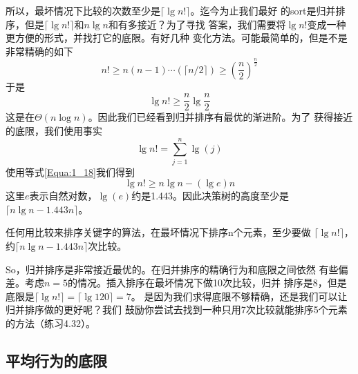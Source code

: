 所以，最坏情况下比较的次数至少是$\lceil\lg n!\rceil$。迄今为止我们最好
的sort是归并排序，但是$\lceil\lg n!\rceil$和$n\lg n$和有多接近？为了寻找
答案，我们需要将$\lg n!$变成一种更方便的形式，并找打它的底限。有好几种
变化方法。可能最简单的，但是不是非常精确的如下
\begin{displaymath}
n! \geq n(n-1)\cdots (\lceil n/2 \rceil) \geq \left( \frac{n}{2} \right)^{\frac{n}{2}}
\end{displaymath}
于是
\begin{displaymath}
\lg n! \geq \frac{n}{2}\lg\frac{n}{2}
\end{displaymath}
这是在$\Theta(n\log n)$。因此我们已经看到归并排序有最优的渐进阶。为了
获得接近的底限，我们使用事实
\begin{displaymath}
\lg n! = \sum_{j=1}^n \lg (j)
\end{displaymath}
使用等式\ref{Equa:1_18}我们得到
\begin{displaymath}
\lg n! \geq n\lg n - (\lg e)n
\end{displaymath}
这里$e$表示自然对数，$\lg(e)$约是1.443。因此决策树的高度至少是
$\lceil n\lg n -1.443n \rceil$。

\begin{theorem}\label{Theorem:4_10}
任何用比较来排序关键字的算法，在最坏情况下排序n个元素，至少要做
$\lceil\lg n!\rceil$，约$\lceil n\lg n -1.443n \rceil$次比较。
\end{theorem}

So，归并排序是非常接近最优的。在归并排序的精确行为和底限之间依然
有些偏差。考虑$n=5$的情况。插入排序在最坏情况下做10次比较，归并
排序是8，但是底限是$\lceil\lg n! \rceil=\lceil \lg 120 \rceil=7$。
是因为我们求得底限不够精确，还是我们可以让归并排序做的更好呢？我们
鼓励你尝试去找到一种只用7次比较就能排序5个元素的方法（练习4.32）。


\subsection{平均行为的底限}\label{Sec:LowerBoundOfAverageBehavior}

